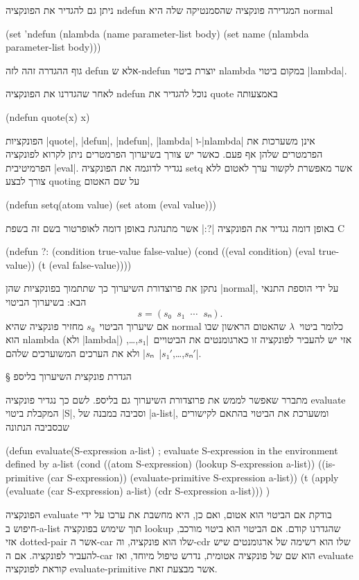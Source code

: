 \documentclass[a4paper,12pt,reqno]{article}
\begin{document}
ניתן גם להגדיר את הפונקציה ndefun המגדירה פונקציה שהסמנטיקה שלה היא normal
\begin{LISP}
(set 'ndefun
  (nlambda (name parameter-list body)
      (set name (nlambda parameter-list body)))
\end{LISP}
גוף ההגדרה זהה לזה defun אלא ש-ndefun יוצרת ביטוי nlambda במקום ביטוי
\E|lambda|.

לאחר שהגדרנו את הפונקציה ndefun נוכל להגדיר את quote באמצעותה
\begin{LISP}
(ndefun quote(x) x)
\end{LISP}
הפונקציות \E|quote|, \E|defun|, \E|ndefun|, \E|lambda| ו-\E|nlambda| אינן
משערכות את הפרמטרים שלהן אף פעם. כאשר יש צורך בשיערוך הפרמטרים ניתן לקרוא
לפונקציה הפרמיטיבית \E|eval|.
נגדיר לדוגמה את הפונקציה setq אשר מאפשרת לקשור ערך לאטום ללא צורך לבצע quoting על שם האטום
\begin{LISP}
(ndefun setq(atom value)
  (set atom (eval value)))
\end{LISP}
באופן דומה נגדיר את הפונקציה \T|?:| אשר מתנהגת באופן דומה לאופרטור בשם זה בשפת C
\begin{LISP}
(ndefun ?: (condition true-value false-value)
  (cond 
    ((eval condition) (eval true-value))
    (t (eval false-value))))  
\end{LISP}

נתקן את פרוצדורת השיערוך כך שתתמוך בפונקציות שהן \E|normal|, על ידי הוספת התנאי
הבא: בשיערוך הביטוי \[
  s=(s₀\;\;s₁\;\;⋯\;\;sₙ).
\] אם שיערוך הביטוי~$s₀$ מחזיר פונקציה שהיא
normal כלומר ביטוי~$λ$ שהאטום הראשון שבו הוא nlambda (ולא \E|lambda|) אזי יש
להעביר לפונקציה זו כארגומנטים את הביטויים~\E|$s₁$,…,$sₙ$| ולא את הערכים
המשוערכים שלהם~\E|$s₁'$,…,$sₙ'$|.

§ הגדרת פונקצית השיערוך בליספ

מתברר שאפשר לממש את פרוצדורת השיערוך גם בליספ.
לשם כך נגדיר פונקציה evaluate
המקבלת ביטוי \E|S|, וסביבה במבנה של \E|a-list|, ומשערכת
את הביטוי בהתאם לקישורים שבסביבה הנתונה
\begin{LISP}
(defun evaluate(S-expression a-list)
; evaluate S-expression in the environment defined by a-list
  (cond
    ((atom S-expression)
      (lookup S-expression a-list))
    ((is-primitive (car S-expression))
      (evaluate-primitive S-expression a-list))
    (t
      (apply
        (evaluate (car S-expression) a-list)
        (cdr S-expression
        a-list)))
)
\end{LISP}
הפונקציה evaluate בודקת אם הביטוי הוא אטום, ואם כן, היא מחשבת את ערכו על ידי
חיפוש ב-a-list תוך שימוש בפונקציה lookup שהגדרנו קודם. אם הביטוי הוא ביטוי
מורכב, אזי dotted-pair אשר ה-car שלו הוא פונקציה, וה-cdr שלו הוא רשימה של
ארגומנטים שיש להעביר לפונקציה. אם ה-car הוא שם של פונקציה אטומית, נדרש טיפול
מיוחד, ואז evaluate קוראת לפונקציה evaluate-primitive אשר מבצעת זאת.
\end{document}
